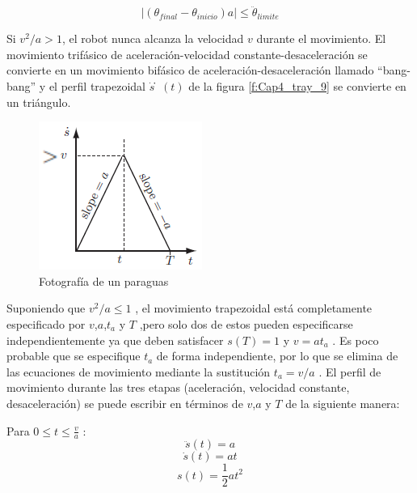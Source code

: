         \begin{equation}
             \left| ({\theta}_{final}-{\theta}_{inicio})a \right|   \leq {\ddot{\theta}}_{limite}
            \label{eq:cap4_tray_29}
        \end{equation}
        
        Si ${v^2}/a > 1$, el robot nunca alcanza la velocidad $v$  durante el movimiento. El movimiento trifásico de aceleración-velocidad constante-desaceleración se convierte en un movimiento bifásico de aceleración-desaceleración llamado “bang-bang” y el perfil trapezoidal $\dot{s}̇(t)$ de la figura \ref{f:Cap4_tray_9} se convierte en un triángulo.
        
        \begin{figure}[htb]
                \centering
                \includegraphics[width=0.27\linewidth]{Main/Chapter4/Images4/cap4_tray_10.png}
                \caption{Fotografía de un paraguas}
                \label{f:Cap4_tray_10}
            \end{figure} 
    
    
            \newpage

        Suponiendo que ${v^2}/a \leq 1$ , el movimiento trapezoidal está completamente especificado por $v$,$a$,$t_a$ y  $T$ ,pero solo dos de estos pueden especificarse independientemente ya que deben satisfacer $s(T)=1$  y $v=at_a$ . Es poco probable que se especifique  $t_a$  de forma independiente, por lo que se elimina de las ecuaciones de movimiento mediante la sustitución ${t}_{a}=v/a$ . El perfil de movimiento durante las tres etapas (aceleración, velocidad constante, desaceleración) se puede escribir en términos de $v$,$a$ y $T$ de la siguiente manera:
        
        Para $0 \leq t \leq \frac{v}{a}$ :
        \begin{equation}
            \ddot{s}(t)=a 
            \label{eq:cap4_tray_30}
        \end{equation}
        \begin{equation}
            \dot{s}(t)=at
            \label{eq:cap4_tray_31}
        \end{equation}
        \begin{equation}
             s(t)=\frac{1}{2}at^2
            \label{eq:cap4_tray_32}
        \end{equation}
        
